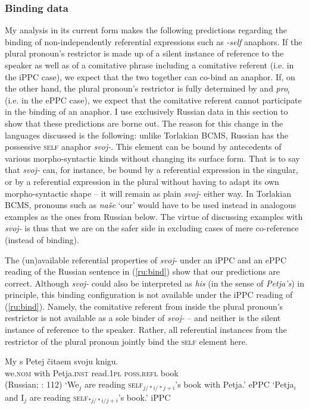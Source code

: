 \documentclass[output=paper,colorlinks,citecolor=brown]{langscibook}
\begin{document}
\subsubsection{Binding data}\label{sec:bind}
My analysis in its current form makes the following predictions regarding the binding of non-independently referential expressions such as \textit{-self} anaphors. If the plural pronoun's restrictor is made up of a silent instance of reference to the speaker as well as of a comitative phrase including a comitative referent (i.e. in the iPPC case), we expect that the two together can co-bind an anaphor. If, on the other hand, the plural pronoun's restrictor is fully determined by  and \textit{pro}$_i$ (i.e. in the ePPC case), we expect that the comitative referent cannot participate in the binding of an anaphor. I use exclusively Russian data in this section to show that these predictions are borne out. The reason for this change in the languages discussed is the following: unlike Torlakian BCMS, Russian has the possessive \textsc{self} anaphor \textit{svoj-}. This element can be bound by antecedents of various morpho-syntactic kinds without changing its surface form. That is to say that \textit{svoj-} can, for instance, be bound by a referential expression in the singular, or by a referential expression in the plural without having to adapt its own morpho-syntactic shape -- it will remain as plain \textit{svoj-} either way. In Torlakian BCMS, pronouns such as \textit{naše} `our' would have to be used instead in analogous examples as the ones from Russian below. The virtue of discussing examples with \textit{svoj-} is thus that we are on the safer side in excluding cases of mere co-reference (instead of binding).


The (un)available referential properties of \textit{svoj-} under an iPPC  and an ePPC reading of the Russian sentence in (\ref{ru:bind}) show that our predictions are correct. Although \textit{svoj-} could also be interpreted as \textit{his} (in the sense of \textit{Petja's}) in principle, this binding configuration is not available under the iPPC reading of (\ref{ru:bind}). Namely, the comitative referent from inside the plural pronoun's restrictor is not available as a sole binder of \textit{svoj-} -- and neither is the silent instance of reference to the speaker. Rather, all referential instances from the restrictor of the plural pronoun jointly bind the \textsc{self} element here.

\newpage
\ea
\gll My s Petej čitaem svoju knigu. \\
 we.\textsc{nom} with Petja.\textsc{inst} read.\textsc{1pl} \textsc{poss.refl} book \\
 \glt \hfill (Russian; \cite{VassilievaLarson2005}: 112) \label{ru:bind}
\ea `We$_j$ are reading \textsc{self}$_{j/*i/*j+i}$'s book with Petja.' \hfill ePPC\label{ru:binde}
\ex `Petja$_i$ and I$_j$ are reading \textsc{self}$_{*j/*i/j+i}$'s book.' \hfill iPPC
\z \z 
\end{document}
